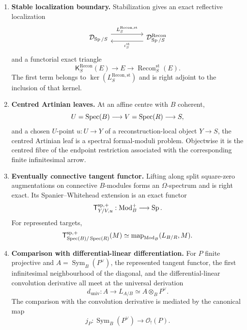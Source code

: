 \begin{theorem}
\begin{enumerate}[label=(\roman*)]
    \item \textbf{Stable localization boundary.}
    Stabilization gives an exact reflective localization
    \[
    \begin{tikzcd}[column sep=huge]
        \mathcal D_{\Sp/S}
            \arrow[r,shift left=1.2ex,"L^{\mathrm{Recon},\mathrm{st}}_S"]
            &
        \mathcal D^{\mathrm{Recon}}_{\Sp/S}
            \arrow[l,shift left=1.2ex,"\iota^{\mathrm{st}}_S"]
    \end{tikzcd}
    \]
    and a functorial exact triangle
    \[
        \mathsf K^{\mathrm{Recon}}_S(E)
        \longrightarrow
        E
        \longrightarrow
        \operatorname{Recon}^{\mathrm{st}}_S(E).
    \]
    The first term belongs to
    \(\ker(L^{\mathrm{Recon},\mathrm{st}}_S)\) and is right adjoint to the
    inclusion of that kernel.

    \item \textbf{Centred Artinian leaves.}
    At an affine centre with \(B\) coherent,
    \[
        U=\operatorname{Spec}(B)\longrightarrow V=\operatorname{Spec}(R)\longrightarrow S,
    \]
    and a chosen \(U\)-point \(u:U\to Y\) of a reconstruction-local object
    \(Y\to S\), the centred Artinian leaf is a spectral formal-moduli problem. Objectwise it is the centred fibre of the
    endpoint restriction associated with the corresponding finite
    infinitesimal arrow.

    \item \textbf{Eventually connective tangent functor.}
    Lifting along split square-zero augmentations on connective \(B\)-modules forms an
    \(\Omega\)-spectrum and is right exact. Its Spanier--Whitehead extension
    is an exact functor
    \[
        \mathsf T^{\mathrm{sp},+}_{Y/V,u}:
        \operatorname{Mod}_B^+\longrightarrow\operatorname{Sp}.
    \]
    For represented targets,
    \[
        \mathsf T^{\mathrm{sp},+}_{\operatorname{Spec}(B)/\operatorname{Spec}(R)}(M)
        \simeq
        \operatorname{map}_{\operatorname{Mod}_B}(L_{B/R},M).
    \]

    \item \textbf{Comparison with differential-linear differentiation.}
    For \(P\) finite projective and
    \(A=\operatorname{Sym}_B(P^\vee)\), the represented tangent functor, the
    first infinitesimal neighbourhood of the diagonal, and the
    differential-linear convolution derivative all meet at the universal
    derivation
    \[
        d_{\mathrm{univ}}:
        A\longrightarrow L_{A/B}
        \simeq A\otimes_BP^\vee.
    \]
    The comparison with the convolution derivative is mediated by the
    canonical map
    \[
        j_P:
        \operatorname{Sym}_B(P^\vee)\longrightarrow\mathcal O_!(P).
    \]
\end{enumerate}
\end{theorem}

